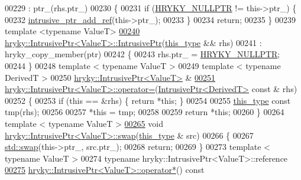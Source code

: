 \begin{DoxyCode}
00229     : ptr\_(rhs.ptr\_)
00230 \{
00231     \textcolor{keywordflow}{if} (\hyperlink{common_8h_a4cd4ac09cfcdbd6b30ee69afc156e210}{HRYKY_NULLPTR} != this->ptr\_) \{
00232         \hyperlink{namespacehryky_1_1reduction_ab59dece4af8e91c10781e3b092c06d1b}{intrusive_ptr_add_ref}(this->ptr\_);
00233     \}
00234     \textcolor{keywordflow}{return};
00235 \}
00239 \textcolor{keyword}{template} <\textcolor{keyword}{typename} ValueT>
\hypertarget{intrusive__ptr_8h_source_l00240}{}\hyperlink{classhryky_1_1_intrusive_ptr_a8e1f34b5c5ffd6b3f64126f3cef4e908}{00240} \hyperlink{classhryky_1_1_intrusive_ptr}{hryky::IntrusivePtr<ValueT>::IntrusivePtr}(\hyperlink{classhryky_1_1_intrusive_ptr}{this_type} && rhs)
00241     : hryky\_copy\_member(ptr)
00242 \{
00243     rhs.ptr\_ = \hyperlink{common_8h_a4cd4ac09cfcdbd6b30ee69afc156e210}{HRYKY_NULLPTR};
00244 \}
00248 \textcolor{keyword}{template} < \textcolor{keyword}{typename} ValueT >
00249 \textcolor{keyword}{template} < \textcolor{keyword}{typename} DerivedT >
00250 \hyperlink{classhryky_1_1_intrusive_ptr}{hryky::IntrusivePtr<ValueT>} &
\hypertarget{intrusive__ptr_8h_source_l00251}{}\hyperlink{classhryky_1_1_intrusive_ptr_aa738864278a9e6b6ab452cd010a23b86}{00251} \hyperlink{classhryky_1_1_intrusive_ptr}{hryky::IntrusivePtr<ValueT>::operator=}(\hyperlink{classhryky_1_1_intrusive_ptr}{IntrusivePtr<DerivedT>} \textcolor{keyword}{const} & rhs)
00252 \{
00253     \textcolor{keywordflow}{if} (\textcolor{keyword}{this} == &rhs) \{ \textcolor{keywordflow}{return} *\textcolor{keyword}{this}; \}
00254 
00255     \hyperlink{classhryky_1_1_intrusive_ptr}{this_type} \textcolor{keyword}{const} tmp(rhs);
00256 
00257     *\textcolor{keyword}{this} = tmp;
00258     
00259     \textcolor{keywordflow}{return} *\textcolor{keyword}{this};
00260 \}
00264 \textcolor{keyword}{template} < \textcolor{keyword}{typename} ValueT >
\hypertarget{intrusive__ptr_8h_source_l00265}{}\hyperlink{classhryky_1_1_intrusive_ptr_ab60b6a55a688776b82510c08c614709c}{00265} \textcolor{keywordtype}{void} \hyperlink{namespacehryky_a4282146df5ea2b68cb667896a2205909}{hryky::IntrusivePtr<ValueT>::swap}(\hyperlink{classhryky_1_1_intrusive_ptr}{this_type} & src)
00266 \{
00267     \hyperlink{namespacehryky_a4282146df5ea2b68cb667896a2205909}{std::swap}(this->ptr\_, src.ptr\_);
00268     \textcolor{keywordflow}{return};
00269 \}
00273 \textcolor{keyword}{template} < \textcolor{keyword}{typename} ValueT >
00274 \textcolor{keyword}{typename} hryky::IntrusivePtr<ValueT>::reference
\hypertarget{intrusive__ptr_8h_source_l00275}{}\hyperlink{classhryky_1_1_intrusive_ptr_a1079b1e2ed0dfe513d609ad05f64c1f2}{00275} \hyperlink{classhryky_1_1_intrusive_ptr}{hryky::IntrusivePtr<ValueT>::operator*}()\textcolor{keyword}{ const}

\end{DoxyCode}
